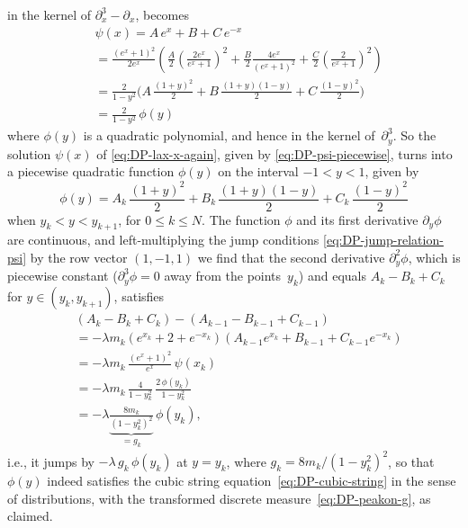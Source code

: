 \documentclass[10pt,a4paper]{article} \pdfoutput=1 
\begin{document}
in the kernel of $\partial_x^3 - \partial_x$,
becomes
\begin{equation*}
  \begin{split}
    &
    \psi(x)
    = A \, e^x + B + C \, e^{-x}
    \\ &
    = \frac{(e^x+1)^2}{2e^x}
    \left(
      \frac{A}{2} \left( \frac{2e^x}{e^x+1} \right)^2 +
      \frac{B}{2} \frac{4e^x}{(e^x+1)^2} +
      \frac{C}{2} \left( \frac{2}{e^x+1} \right)^2
    \right)
    \\ &
    = \frac{2}{1-y^2}
    \biggl(
    A \, \frac{(1+y)^2}{2} +
    B \, \frac{(1+y)(1-y)}{2} +
    C \, \frac{(1-y)^2}{2}
    \biggr)
    \\ &
    = \frac{2}{1-y^2} \, \phi(y)
  \end{split}
\end{equation*}
where $\phi(y)$ is a quadratic polynomial,
and hence in the kernel of~$\partial_y^3$.
So the solution $\psi(x)$ of \eqref{eq:DP-lax-x-again},
given by \eqref{eq:DP-psi-piecewise},
turns into a piecewise quadratic function $\phi(y)$ on the interval $-1 < y < 1$,
given by
\begin{equation}
  \label{eq:DP-phi-piecewise}
  \phi(y) =
  A_k \, \frac{(1+y)^2}{2} +
  B_k \, \frac{(1+y)(1-y)}{2} +
  C_k \, \frac{(1-y)^2}{2}
\end{equation}
when $y_k < y < y_{k+1}$, for $0 \le k \le N$.
The function $\phi$ and its first derivative $\partial_y \phi$ are continuous,
and left-multiplying the jump conditions \eqref{eq:DP-jump-relation-psi} by
the row vector $(1,-1,1)$
we find that the second derivative $\partial_y^2 \phi$,
which is piecewise constant ($\partial_y^3 \phi=0$ away from the points~$y_k$)
and equals $A_k - B_k + C_k$ for $y \in (y_k, y_{k+1})$,
satisfies
\begin{equation*}
  \begin{split}
    &
    (A_k - B_k + C_k) - (A_{k-1} - B_{k-1} + C_{k-1})
    \\ &
    = - \lambda m_k (e^{x_k}+2+e^{-x_k}) (A_{k-1} e^{x_k} + B_{k-1} + C_{k-1} e^{-x_k})
    \\ &
    = - \lambda m_k \, \frac{(e^x+1)^2}{e^{x}} \, \psi(x_k)
    \\ &
    = - \lambda m_k \, \frac{4}{1-y_k^2} \, \frac{2 \, \phi(y_k)}{1-y_k^2}
    \\ &
    = - \lambda \underbrace{\frac{8 m_k}{(1-y_k^2)^2}}_{= g_k} \, \phi(y_k)
    ,
  \end{split}
\end{equation*}
i.e., it jumps by $-\lambda \, g_k \, \phi(y_k)$ at $y=y_k$,
where $g_k = 8 m_k / (1-y_k^2)^2$,
so that $\phi(y)$ indeed satisfies the cubic string equation~\eqref{eq:DP-cubic-string}
in the sense of distributions,
with the transformed discrete measure~\eqref{eq:DP-peakon-g}, as claimed.
\end{document}
